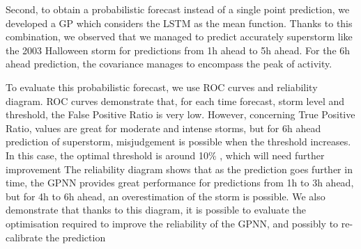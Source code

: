 Second, to obtain a probabilistic forecast instead of a single point prediction, we developed a GP which 
considers the LSTM as the mean function. Thanks to this combination, we observed that we managed to predict 
accurately superstorm like the 2003 Halloween storm for predictions from 1h ahead to 5h ahead. For the 
6h ahead prediction, the covariance manages to encompass the peak of activity. 

To evaluate this probabilistic forecast, we use ROC curves and reliability diagram. ROC curves demonstrate that, 
for each time forecast, storm level and threshold, the False Positive Ratio is very low. However, concerning 
True Positive Ratio, values are great for moderate and intense storms, but for 6h ahead prediction of superstorm, 
misjudgement is possible when the threshold increases. In this case, the optimal threshold is around 10$\%$ , 
which will need further improvement The reliability diagram shows that as the prediction goes further in time, 
the GPNN provides great performance for predictions from 1h to 3h ahead, but for 4h to 6h ahead, 
an overestimation of the storm is possible. We also demonstrate that thanks to this diagram, it is possible to 
evaluate the optimisation required to improve the reliability of the GPNN, and possibly to 
re-calibrate the prediction


